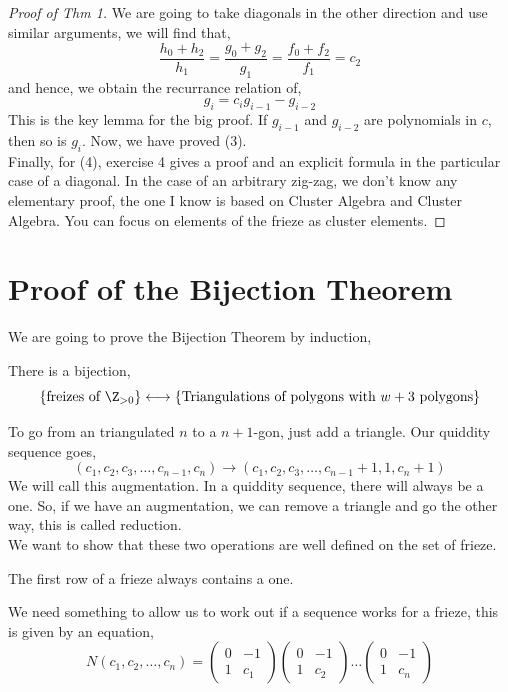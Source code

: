 \documentclass{article}
\begin{document}
\begin{proof}[Proof of Thm 1]
  We are going to take diagonals in the other direction and use similar arguments, we will find that,
  $$ \frac{h_0+h_2}{h_1} = \frac{g_0 + g_2}{g_1} = \frac{f_0 + f_2}{f_1} = c_2 $$
  and hence, we obtain the recurrance relation of,
  $$ g_i = c_ig_{i-1} - g_{i-2} $$
  This is the key lemma for the big proof. If $g_{i-1}$ and $g_{i-2}$ are polynomials in $c$, then so is $g_i$. Now, we have proved (3). \\

  Finally, for (4), exercise 4 gives a proof and an explicit formula in the particular case of a diagonal. In the case of an arbitrary zig-zag, we don't know any elementary proof, the one I know is based on Cluster Algebra and Cluster Algebra. You can focus on elements of the frieze as cluster elements.
\end{proof}

\section{Proof of the Bijection Theorem}
We are going to prove the Bijection Theorem by induction,\\

\begin{nthm}
  There is a bijection,
  $$ \{\text{freizes of $\Z_{>0}$}\} \longleftrightarrow \{\text{Triangulations of polygons with $w + 3$ polygons} \} $$
\end{nthm}

To go from an triangulated $n$ to a $n+1$-gon, just add a triangle. Our quiddity sequence goes,
$$ (c_1, c_2, c_3, \dots, c_{n-1}, c_n) \to (c_1, c_2, c_3, \dots, c_{n-1}+1, 1, c_n+1) $$
We will call this augmentation. In a quiddity sequence, there will always be a one. So, if we have an augmentation, we can remove a triangle and go the other way, this is called reduction.\\

We want to show that these two operations are well defined on the set of frieze.

\begin{nlemma}[]
  The first row of a frieze always contains a one.
\end{nlemma}

We need something to allow us to work out if a sequence works for a frieze, this is given by an equation,
\begin{equation}
  N(c_1, c_2, \dots, c_n) = \begin{pmatrix}
    0 & -1 \\ 1 & c_1
\end{pmatrix}\begin{pmatrix}
  0 & -1 \\ 1 & c_2
\end{pmatrix} \dots \begin{pmatrix}
  0 & -1 \\ 1 & c_n
\end{pmatrix}
\end{equation}
\end{document}
